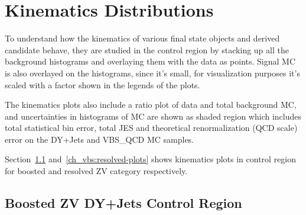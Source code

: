 \clearpage
\section{Kinematics Distributions}

To understand how the kinematics of various final state objects and
derived candidate behave, they are studied in the control
region by stacking up all the background histograms and
overlaying them with the data as points.
Signal \gls{MC} is also overlayed on the histograms, since it's small,
for visualization purposes it's scaled with a factor shown in
the legends of the plots.

The kinematics plots also include a ratio plot of data and total background
\gls{MC}, and uncertainties in histograms of \gls{MC} are shown as shaded region
which includes total statistical bin error, total \gls{JES} and
theoretical renormalization (QCD scale) error on the DY+Jets and VBS\_QCD \gls{MC} samples.

Section~\ref{ch_vbs:boosted-plots} and~\ref{ch_vbs:resolved-plots}
shows kinematics plots in control region for boosted and
resolved ZV category respectively.

\clearpage{}
\subsection{
  Boosted ZV DY+Jets Control Region
}\label{ch_vbs:boosted-plots}


